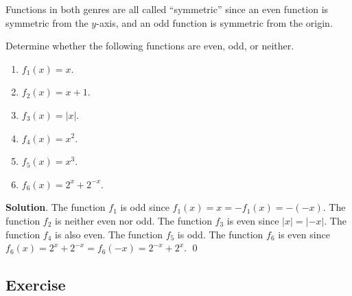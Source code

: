 \documentclass[11pt]{book}
\theoremstyle{break}
\theoremstyle{no_label}
\numberwithin{equation}{section}
\begin{document}
Functions in both genres are all called ``symmetric'' since an even function is symmetric from the $y$-axis, and an odd function is symmetric from the origin.

\begin{example}
    Determine whether the following functions are even, odd, or neither.
    \vspace{-1em}
    \begin{multicols}{3}
        \begin{enumerate}
            \item $f_1(x)=x$.
            \item $f_2(x)=x+1$.
            \item $f_3(x)=|x|$.
            \item $f_4(x)=x^2$.
            \item $f_5(x)=x^3$.
            \item $f_6(x)=2^x+2^{-x}$.
        \end{enumerate}
    \end{multicols}
    \vspace{0.1em}
\end{example}
\textbf{Solution}. The function $f_1$ is odd since $f_1(x)=x=-f_1(x)=-(-x)$. The function $f_2$ is neither even nor odd. The function $f_3$ is even since $|x|=|-x|$. The function $f_4$ is also even. The function $f_5$ is odd. The function $f_6$ is even since $f_6(x)=2^x+2^{-x}=f_6(-x)=2^{-x}+2^x$. \qed

\subsection*{Exercise}
\end{document}
